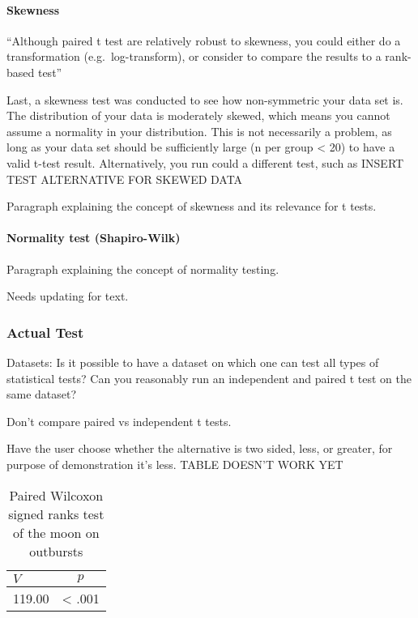 \documentclass[
]{article}
\begin{document}
\hypertarget{skewness}{%
\paragraph{Skewness}\label{skewness}}

``Although paired t test are relatively robust to skewness, you could
either do a transformation (e.g.~log-transform), or consider to compare
the results to a rank-based test''

Last, a skewness test was conducted to see how non-symmetric your data
set is. The distribution of your data is moderately skewed, which means
you cannot assume a normality in your distribution. This is not
necessarily a problem, as long as your data set should be sufficiently
large (n per group \textless{} 20) to have a valid t-test result.
Alternatively, you run could a different test, such as INSERT TEST
ALTERNATIVE FOR SKEWED DATA

{Paragraph explaining the concept of skewness and its relevance for t
tests.}

\hypertarget{normality-test-shapiro-wilk}{%
\paragraph{Normality test
(Shapiro-Wilk)}\label{normality-test-shapiro-wilk}}

Paragraph explaining the concept of normality testing.

Needs updating for text.

\hypertarget{actual-test}{%
\subsubsection{Actual Test}\label{actual-test}}

Datasets: Is it possible to have a dataset on which one can test all
types of statistical tests? Can you reasonably run an independent and
paired t test on the same dataset?

Don't compare paired vs independent t tests.

{Have the user choose whether the alternative is two sided, less, or
greater, for purpose of demonstration it's less. TABLE DOESN'T WORK YET}

\begin{table}[tbp]

\begin{center}
\begin{threeparttable}

\caption{\label{tab:comparison_table}Paired Wilcoxon signed ranks test of the moon on outbursts}

\begin{tabular}{ll}
\toprule
$V$ & \multicolumn{1}{c}{$p$}\\
\midrule
119.00 & < .001\\
\bottomrule
\end{tabular}

\end{threeparttable}
\end{center}

\end{table}
\end{document}
